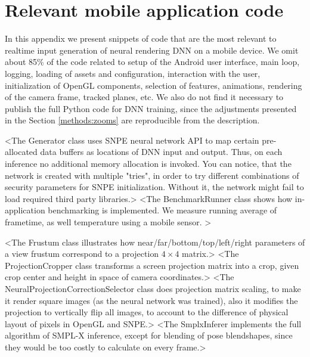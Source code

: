 \chapter{Relevant mobile application code}


In this appendix we present snippets of code that are the most relevant to realtime input generation of neural rendering DNN on a mobile device. We omit about 85\% of the code related to setup of the Android user interface, main loop, logging, loading of assets and configuration, interaction with the user, initialization of OpenGL components, selection of features, animations, rendering of the camera frame, tracked planes, etc. We also do not find it necessary to publish the full Python code for DNN training, since the adjustments presented in the Section \ref{methods:zooms} are reproducible from the description.


<The Generator class uses SNPE neural network API to map certain pre-allocated data buffers as locations of DNN input and output. Thus, on each inference no additional memory allocation is invoked. You can notice, that the network is created with multiple "tries", in order to try different combinations of security parameters for SNPE initialization. Without it, the network might fail to load required third party libraries.>
<The BenchmarkRunner class shows how in-application benchmarking is implemented. We measure running average of frametime, as well temperature using a mobile sensor. >


<The Frustum class illustrates how near/far/bottom/top/left/right parameters of a view frustum correspond to a projection $4\times4$ matrix.>
<The ProjectionCropper class transforms a screen projection matrix into a crop, given crop center and height in space of camera coordinates.>
<The NeuralProjectionCorrectionSelector class does projection matrix scaling, to make it render square images (as the neural network was trained), also it modifies the projection to vertically flip all images, to account to the difference of physical layout of pixels in OpenGL and SNPE.>
<The SmplxInferer implements the full algorithm of SMPL-X inference, except for blending of pose blendshapes, since they would be too costly to calculate on every frame.>

